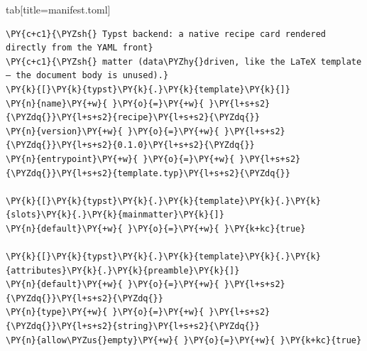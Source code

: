 \documentclass[a4paper,twoside]{article}
\begin{document}
\begin{tsdiv}{tab}[title=manifest.toml]
\begin{tscode}[lang=toml, engine=pygments]
\begin{Verbatim}[commandchars=\\\{\},breaklines, breakanywhere, commandchars=\\\{\}]
\PY{c+c1}{\PYZsh{} Typst backend: a native recipe card rendered directly from the YAML front}
\PY{c+c1}{\PYZsh{} matter (data\PYZhy{}driven, like the LaTeX template — the document body is unused).}
\PY{k}{[}\PY{k}{typst}\PY{k}{.}\PY{k}{template}\PY{k}{]}
\PY{n}{name}\PY{+w}{ }\PY{o}{=}\PY{+w}{ }\PY{l+s+s2}{\PYZdq{}}\PY{l+s+s2}{recipe}\PY{l+s+s2}{\PYZdq{}}
\PY{n}{version}\PY{+w}{ }\PY{o}{=}\PY{+w}{ }\PY{l+s+s2}{\PYZdq{}}\PY{l+s+s2}{0.1.0}\PY{l+s+s2}{\PYZdq{}}
\PY{n}{entrypoint}\PY{+w}{ }\PY{o}{=}\PY{+w}{ }\PY{l+s+s2}{\PYZdq{}}\PY{l+s+s2}{template.typ}\PY{l+s+s2}{\PYZdq{}}

\PY{k}{[}\PY{k}{typst}\PY{k}{.}\PY{k}{template}\PY{k}{.}\PY{k}{slots}\PY{k}{.}\PY{k}{mainmatter}\PY{k}{]}
\PY{n}{default}\PY{+w}{ }\PY{o}{=}\PY{+w}{ }\PY{k+kc}{true}

\PY{k}{[}\PY{k}{typst}\PY{k}{.}\PY{k}{template}\PY{k}{.}\PY{k}{attributes}\PY{k}{.}\PY{k}{preamble}\PY{k}{]}
\PY{n}{default}\PY{+w}{ }\PY{o}{=}\PY{+w}{ }\PY{l+s+s2}{\PYZdq{}}\PY{l+s+s2}{\PYZdq{}}
\PY{n}{type}\PY{+w}{ }\PY{o}{=}\PY{+w}{ }\PY{l+s+s2}{\PYZdq{}}\PY{l+s+s2}{string}\PY{l+s+s2}{\PYZdq{}}
\PY{n}{allow\PYZus{}empty}\PY{+w}{ }\PY{o}{=}\PY{+w}{ }\PY{k+kc}{true}
\end{Verbatim}
\end{tscode}
\end{tsdiv}
\end{document}
